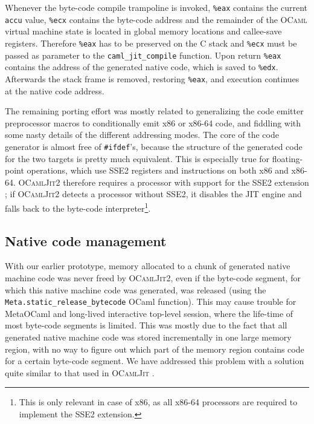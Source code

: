 \documentclass[12pt,a4paper,final]{article}
\begin{document}
Whenever the byte-code compile trampoline is invoked, \texttt{\%eax} contains
the current \texttt{accu} value, \texttt{\%ecx} contains the byte-code address
and the remainder of the \textsc{OCaml} virtual machine state is located in
global memory locations and callee-save registers. Therefore \texttt{\%eax}
has to be preserved on the C stack and \texttt{\%ecx} must be passed as parameter
to the \texttt{caml\_jit\_compile} function. Upon return \texttt{\%eax} contains
the address of the generated native code, which is saved to \texttt{\%edx}.
Afterwards the stack frame is removed, restoring \texttt{\%eax}, and execution
continues at the native code address.

The remaining porting effort was mostly related to generalizing the code
emitter preprocessor macros to conditionally emit x86 or x86-64 code, and fiddling with
some nasty details of the different addressing modes. The core of the code
generator is almost free of \texttt{\#ifdef}'s, because the structure of the generated code
for the two targets is pretty much equivalent. This is especially true for
floating-point operations, which use SSE2 registers and instructions on
both x86 and x86-64. \textsc{OCamlJit2} therefore requires a processor
with support for the SSE2 extension \cite{Amd09Vol1,Intel10Vol1}; if \textsc{OCamlJit2} detects a
processor without SSE2, it disables the JIT engine and falls back to
the byte-code interpreter\footnote{This is only relevant in case of x86,
as all x86-64 processors are required to implement the SSE2 extension.}.

\subsection{Native code management} \label{subsection:Native_code_management}

With our earlier prototype, memory allocated to a chunk of generated native machine code was never freed
by \textsc{OCamlJit2}, even if the byte-code segment, for which this native machine code
was generated, was released (using the \texttt{Meta.static\_release\_bytecode} OCaml
function). This may cause trouble for MetaOCaml \cite{Taha06} and long-lived interactive
top-level session, where the life-time of most byte-code segments is limited.
This was mostly due to the fact that all generated native machine code was stored 
incrementally in one large memory region, with no way to figure out which part of
the memory region contains code for a certain byte-code segment. We have addressed
this problem with a solution quite similar to that used in \textsc{OCamlJit}
\cite{Starynkevitch04}.
\end{document}
